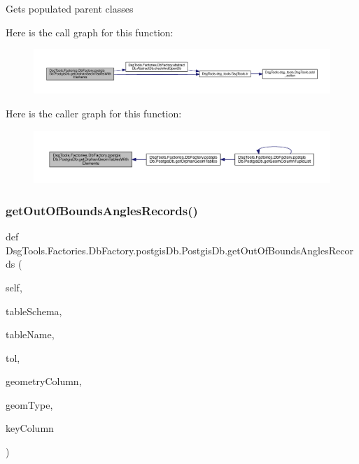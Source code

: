 \begin{DoxyVerb}Gets populated parent classes
\end{DoxyVerb}
 Here is the call graph for this function\+:
\nopagebreak
\begin{figure}[H]
\begin{center}
\leavevmode
\includegraphics[width=350pt]{class_dsg_tools_1_1_factories_1_1_db_factory_1_1postgis_db_1_1_postgis_db_abb82aa10c5652a8c38442a4c15d8eeba_cgraph}
\end{center}
\end{figure}
Here is the caller graph for this function\+:
\nopagebreak
\begin{figure}[H]
\begin{center}
\leavevmode
\includegraphics[width=350pt]{class_dsg_tools_1_1_factories_1_1_db_factory_1_1postgis_db_1_1_postgis_db_abb82aa10c5652a8c38442a4c15d8eeba_icgraph}
\end{center}
\end{figure}
\mbox{\label{class_dsg_tools_1_1_factories_1_1_db_factory_1_1postgis_db_1_1_postgis_db_a9e31c11791060c35255b94f5c36c9ce2}} 
\subsubsection{\texorpdfstring{get\+Out\+Of\+Bounds\+Angles\+Records()}{getOutOfBoundsAnglesRecords()}}
{\footnotesize\ttfamily def Dsg\+Tools.\+Factories.\+Db\+Factory.\+postgis\+Db.\+Postgis\+Db.\+get\+Out\+Of\+Bounds\+Angles\+Records (\begin{DoxyParamCaption}\item[{}]{self,  }\item[{}]{table\+Schema,  }\item[{}]{table\+Name,  }\item[{}]{tol,  }\item[{}]{geometry\+Column,  }\item[{}]{geom\+Type,  }\item[{}]{key\+Column }\end{DoxyParamCaption})}

